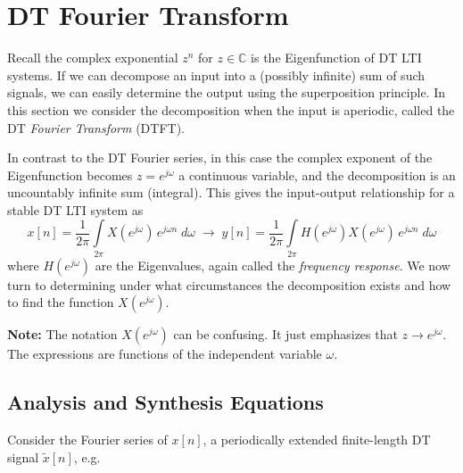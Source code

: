 \chapter{DT Fourier Transform}

Recall the complex exponential $z^{n}$ for $z\in\mathbb{C}$ is the Eigenfunction of DT LTI systems. If we can decompose an input into a (possibly infinite) sum of such signals, we can easily determine the output using the superposition principle. In this section we consider the decomposition when the input is aperiodic, called the DT \emph{Fourier Transform} (DTFT).

In contrast to the DT Fourier series, in this case the complex exponent of the Eigenfunction becomes $z = e^{j\omega}$ a continuous variable, and the decomposition is an uncountably infinite sum (integral). This gives the input-output relationship for a stable DT LTI system as
\[
x[n] = \frac{1}{2\pi}\int\limits_{2\pi} X\left(e^{j\omega}\right) \, e^{j \omega n}\; d\omega \;\longrightarrow\; y[n] = \frac{1}{2\pi}\int\limits_{2\pi} H\left(e^{j\omega}\right) X\left(e^{j\omega}\right) \, e^{j \omega n}\; d\omega
\]
where $H\left(e^{j \omega}\right)$ are the Eigenvalues, again called the \emph{frequency response}. We now turn to determining under what circumstances the decomposition exists and how to find the function $X\left(e^{j\omega}\right)$.

\textbf{Note:} The notation $X\left(e^{j\omega}\right)$ can be confusing. It just emphasizes that $z \rightarrow e^{j\omega}$. The expressions are functions of the independent variable $\omega$.

\section{Analysis and Synthesis Equations}

Consider the Fourier series of $x[n]$, a periodically extended finite-length DT signal $\tilde{x}[n]$, e.g.

